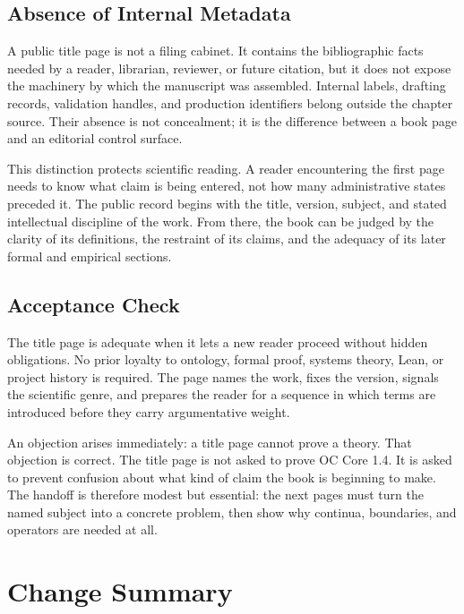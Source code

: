 \documentclass[11pt,a4paper,openany]{book}
\begin{document}
\subsection{Absence of Internal Metadata}
A public title page is not a filing cabinet. It contains the bibliographic facts needed by a reader, librarian, reviewer, or future citation, but it does not expose the machinery by which the manuscript was assembled. Internal labels, drafting records, validation handles, and production identifiers belong outside the chapter source. Their absence is not concealment; it is the difference between a book page and an editorial control surface. \cite{stauffer_percolation,grimmett_percolation}\par
This distinction protects scientific reading. A reader encountering the first page needs to know what claim is being entered, not how many administrative states preceded it. The public record begins with the title, version, subject, and stated intellectual discipline of the work. From there, the book can be judged by the clarity of its definitions, the restraint of its claims, and the adequacy of its later formal and empirical sections.\par
\subsection{Acceptance Check}
The title page is adequate when it lets a new reader proceed without hidden obligations. No prior loyalty to ontology, formal proof, systems theory, Lean, or project history is required. The page names the work, fixes the version, signals the scientific genre, and prepares the reader for a sequence in which terms are introduced before they carry argumentative weight. \cite{stauffer_percolation,grimmett_percolation}\par
An objection arises immediately: a title page cannot prove a theory. That objection is correct. The title page is not asked to prove OC Core 1.4. It is asked to prevent confusion about what kind of claim the book is beginning to make. The handoff is therefore modest but essential: the next pages must turn the named subject into a concrete problem, then show why continua, boundaries, and operators are needed at all.\par
\section{Change Summary}
\end{document}
